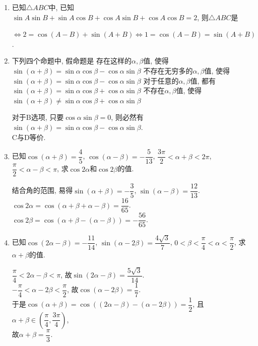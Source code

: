\begin{enumerate}
\item 已知$\triangle{ABC}$中, 已知$\sin{A}\sin{B}+\sin{A}\cos{B}+\cos{A}\sin{B}+\cos{A}\cos{B}=2$, 则$\triangle{ABC}$是
\begin{jieda}
$\iff 2=\cos\left(A-B\right)+\sin\left(A+B\right)\iff 1=\cos\left(A-B\right)=\sin\left(A+B\right)$. 
\end{jieda}


\item 下列四个命题中, 假命题是
\xx
{存在这样的$\alpha,\beta$值, 使得$\sin\left(\alpha+\beta\right)=\sin\alpha\cos\beta-\cos\alpha\sin\beta$}
{不存在无穷多的$\alpha,\beta$值, 使得$\sin\left(\alpha+\beta\right)=\sin\alpha\cos\beta-\cos\alpha\sin\beta$}
{对于任意的$\alpha,\beta$值, 都有$\sin\left(\alpha+\beta\right)=\sin\alpha\cos\beta+\cos\alpha\sin\beta$}
{不存在$\alpha,\beta$值, 使得$\sin\left(\alpha+\beta\right)\neq\sin\alpha\cos\beta+\cos\alpha\sin\beta$}
\begin{jieda}
对于B选项, 只要$\cos\alpha\sin\beta=0$, 则必然有$\sin\left(\alpha+\beta\right)=\sin\alpha\cos\beta-\cos\alpha\sin\beta$. \\
C与D等价. 
\end{jieda}

\item 已知$\cos\left(\alpha+\beta\right)=\dfrac{4}{5}$, $\cos\left(\alpha-\beta\right)=-\dfrac{5}{13}$, 
$\dfrac{3\pi}{2}<\alpha+\beta<2\pi$, $\dfrac{\pi}{2}<\alpha-\beta<\pi$, 求$\cos2\alpha$和$\cos2\beta$的值. 
\begin{jieda}
结合角的范围, 易得$\sin\left(\alpha+\beta\right)=-\dfrac{3}{5}$, $\sin\left(\alpha-\beta\right)=\dfrac{12}{13}$. \\
$\cos2\alpha=\cos\left(\alpha+\beta+\alpha-\beta\right)=\dfrac{16}{65}$. \\
$\cos2\beta=\cos\left(\alpha+\beta-\left(\alpha-\beta\right)\right)=-\dfrac{56}{65}$. 
\end{jieda}


\item 已知$\cos\left(2\alpha-\beta\right)=-\dfrac{11}{14}$, $\sin\left(\alpha-2\beta\right)=\dfrac{4\sqrt{3}}{7}$, 
$0<\beta<\dfrac{\pi}{4}<\alpha<\dfrac{\pi}{2}$, 求$\alpha+\beta$的值. 
\begin{jieda}
$\dfrac{\pi}{4}<2\alpha-\beta<\pi$, 故$\sin\left(2\alpha-\beta\right)=\dfrac{5\sqrt{3}}{14}$. \\
$-\dfrac{\pi}{4}<\alpha-2\beta<\dfrac{\pi}{2}$, 故$\cos\left(\alpha-2\beta\right)=\dfrac{1}{7}$. \\
于是$\cos\left(\alpha+\beta\right)=\cos\left(\left(2\alpha-\beta\right)-\left(\alpha-2\beta\right)\right)=\dfrac{1}{2}$, 且$\alpha+\beta\in\left(\dfrac{\pi}{4},\dfrac{3\pi}{4}\right)$, \\
故$\alpha+\beta=\dfrac{\pi}{3}$. 
\end{jieda}


\end{enumerate}
